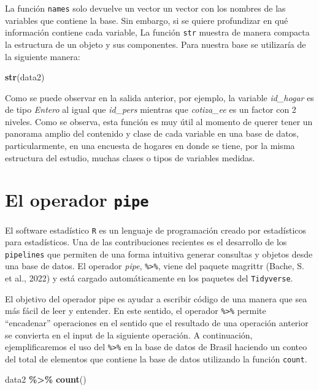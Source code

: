 \documentclass[
  spanish,
  12pt,
]{book}
\newenvironment{Shaded}{\begin{snugshade}}{\end{snugshade}}
\newcommand{\FunctionTok}[1]{\textcolor[rgb]{0.13,0.29,0.53}{\textbf{#1}}}
\newcommand{\NormalTok}[1]{#1}
\newcommand{\SpecialCharTok}[1]{\textcolor[rgb]{0.81,0.36,0.00}{\textbf{#1}}}
\begin{document}
La función \texttt{names} solo devuelve un vector un vector con los nombres de las variables que contiene la base. Sin embargo, si se quiere profundizar en qué información contiene cada variable, La función \texttt{str} muestra de manera compacta la estructura de un objeto y sus componentes. Para nuestra base se utilizaría de la siguiente manera:

\begin{Shaded}
\begin{Highlighting}[]
\FunctionTok{str}\NormalTok{(data2)}
\end{Highlighting}
\end{Shaded}

Como se puede observar en la salida anterior, por ejemplo, la variable \emph{id\_hogar} es de tipo \emph{Entero} al igual que \emph{id\_pers} mientras que \emph{cotiza\_ee} es un factor con 2 niveles. Como se observa, esta función es muy útil al momento de querer tener un panorama amplio del contenido y clase de cada variable en una base de datos, particularmente, en una encuesta de hogares en donde se tiene, por la misma estructura del estudio, muchas clases o tipos de variables medidas.

\section{\texorpdfstring{El operador \texttt{pipe}}{El operador pipe}}\label{el-operador-pipe}

El software estadístico \texttt{R} es un lenguaje de programación creado por estadísticos para estadísticos. Una de las contribuciones recientes es el desarrollo de los \texttt{pipelines} que permiten de una forma intuitiva generar consultas y objetos desde una base de datos. El operador \emph{pipe}, \texttt{\%\textgreater{}\%}, viene del paquete magrittr (Bache, S. et al., 2022) y está cargado automáticamente en los paquetes del \texttt{Tidyverse}.

El objetivo del operador pipe es ayudar a escribir código de una manera que sea más fácil de leer y entender. En este sentido, el operador \texttt{\%\textgreater{}\%} permite ``encadenar'' operaciones en el sentido que el resultado de una operación anterior se convierta en el input de la siguiente operación. A continuación, ejemplificaremos el uso del \texttt{\%\textgreater{}\%} en la base de datos de Brasil haciendo un conteo del total de elementos que contiene la base de datos utilizando la función \texttt{count}.

\begin{Shaded}
\begin{Highlighting}[]
\NormalTok{data2 }\SpecialCharTok{\%\textgreater{}\%} \FunctionTok{count}\NormalTok{()}
\end{Highlighting}
\end{Shaded}
\end{document}
